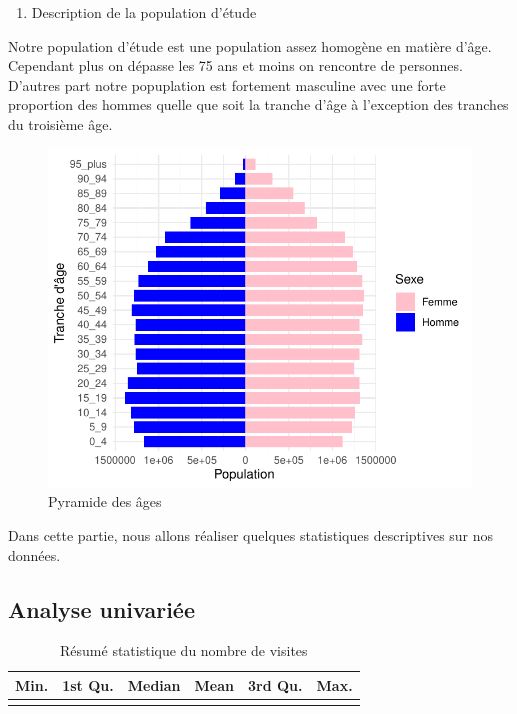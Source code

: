 \documentclass[
]{article}
\providecommand{\tightlist}{%
  \setlength{\itemsep}{0pt}\setlength{\parskip}{0pt}}
\begin{document}
\begin{enumerate}
\def\labelenumi{\arabic{enumi}.}
\tightlist
\item
  Description de la population d'étude
\end{enumerate}

Notre population d'étude est une population assez homogène en matière
d'âge. Cependant plus on dépasse les 75 ans et moins on rencontre de
personnes. D'autres part notre popuplation est fortement masculine avec
une forte proportion des hommes quelle que soit la tranche d'âge à
l'exception des tranches du troisième âge.

\begin{figure}

{\centering \includegraphics{rapport_intermediaire_files/figure-latex/unnamed-chunk-16-1} 

}

\caption{Pyramide des âges}\label{fig:unnamed-chunk-16}
\end{figure}

Dans cette partie, nous allons réaliser quelques statistiques
descriptives sur nos données.

\subsection{Analyse univariée}\label{analyse-univariuxe9e}

\begin{table}[H]
\centering
\caption{\label{tab:unnamed-chunk-17}Résumé statistique du nombre de visites}
\centering
\begin{tabular}[t]{rrrrrr}
\toprule
Min. & 1st Qu. & Median & Mean & 3rd Qu. & Max.\\
\midrule
\cellcolor{gray!10}{1037} & \cellcolor{gray!10}{5993} & \cellcolor{gray!10}{9127} & \cellcolor{gray!10}{19129.63} & \cellcolor{gray!10}{17290} & \cellcolor{gray!10}{765833}\\
\bottomrule
\end{tabular}
\end{table}
\end{document}
